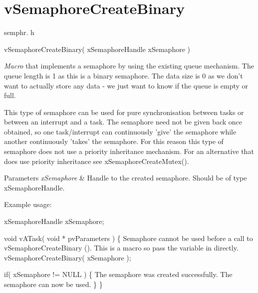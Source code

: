 \hypertarget{group__v_semaphore_create_binary}{\section{v\-Semaphore\-Create\-Binary}
\label{group__v_semaphore_create_binary}
}
semphr. h 
\begin{DoxyPre}vSemaphoreCreateBinary( xSemaphoreHandle xSemaphore )\end{DoxyPre}


{\itshape Macro} that implements a semaphore by using the existing queue mechanism. The queue length is 1 as this is a binary semaphore. The data size is 0 as we don't want to actually store any data -\/ we just want to know if the queue is empty or full.

This type of semaphore can be used for pure synchronisation between tasks or between an interrupt and a task. The semaphore need not be given back once obtained, so one task/interrupt can continuously 'give' the semaphore while another continuously 'takes' the semaphore. For this reason this type of semaphore does not use a priority inheritance mechanism. For an alternative that does use priority inheritance see x\-Semaphore\-Create\-Mutex().


\begin{DoxyParams}{Parameters}
{\em x\-Semaphore} & Handle to the created semaphore. Should be of type x\-Semaphore\-Handle.\\
\hline
\end{DoxyParams}
Example usage\-: 
\begin{DoxyPre}
 xSemaphoreHandle xSemaphore;\end{DoxyPre}



\begin{DoxyPre} void vATask( void * pvParameters )
 \{
Semaphore cannot be used before a call to vSemaphoreCreateBinary ().
This is a macro so pass the variable in directly.
    vSemaphoreCreateBinary( xSemaphore );\end{DoxyPre}



\begin{DoxyPre}    if( xSemaphore != NULL )
    \{
The semaphore was created successfully.
The semaphore can now be used.  
    \}
 \}
 \end{DoxyPre}
 
